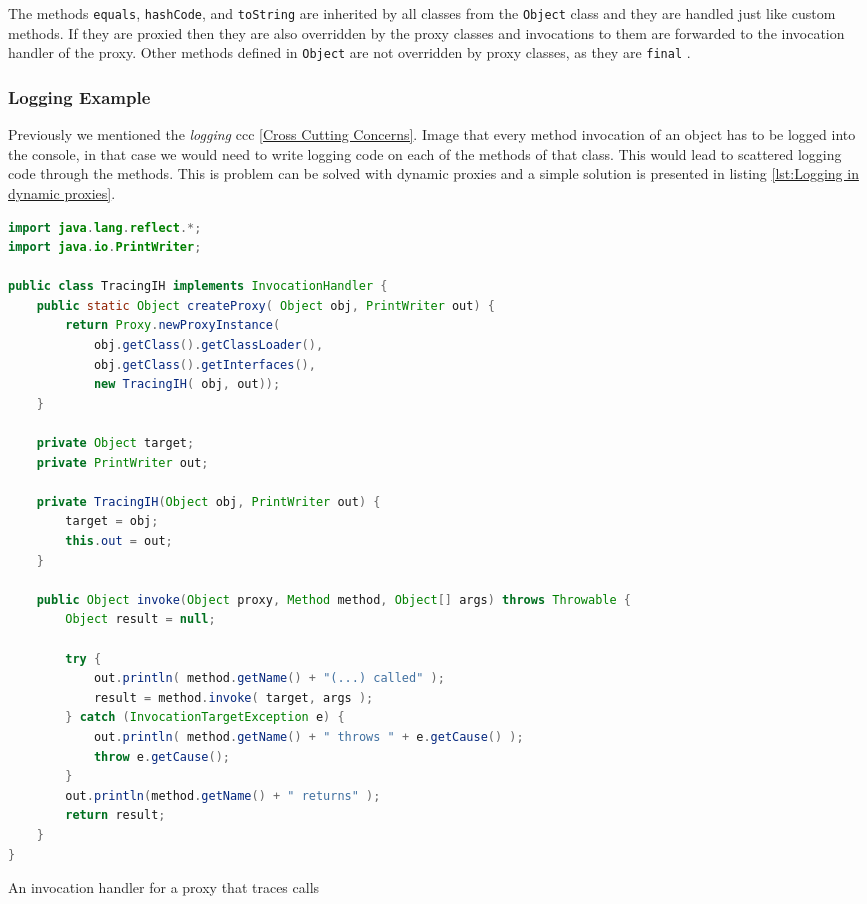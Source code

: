 The methods \texttt{equals}, \texttt{hashCode}, and \texttt{toString} are inherited by all classes from the \texttt{Object} class and they are handled just like custom methods.
If they are proxied then they are also overridden by the proxy classes and invocations to them are forwarded to the invocation handler of the proxy. 
Other methods defined in \texttt{Object} are not overridden by proxy classes, as they are \texttt{final} \cite{eugster2006uniform}.

\subsubsection{Logging Example}
Previously we mentioned the \textit{logging} \ac{ccc} \ref{Cross Cutting Concerns}.
Image that every method invocation of an object has to be logged into the console, in that case we would need to write logging code on each of the methods of that class.
This would lead to scattered logging code through the methods.
This is problem can be solved with dynamic proxies and a simple solution is presented in listing \ref{lst:Logging in dynamic proxies}.

\begin{sourcecode}[H]
	\begin{lstlisting}[language=Java]
import java.lang.reflect.*;
import java.io.PrintWriter;

public class TracingIH implements InvocationHandler {
    public static Object createProxy( Object obj, PrintWriter out) {
        return Proxy.newProxyInstance(
            obj.getClass().getClassLoader(),
            obj.getClass().getInterfaces(),
            new TracingIH( obj, out));
    }

    private Object target;
    private PrintWriter out;

    private TracingIH(Object obj, PrintWriter out) {
        target = obj;
        this.out = out;
    }

    public Object invoke(Object proxy, Method method, Object[] args) throws Throwable {
        Object result = null;

        try {
            out.println( method.getName() + "(...) called" );
            result = method.invoke( target, args );
        } catch (InvocationTargetException e) {
            out.println( method.getName() + " throws " + e.getCause() );
            throw e.getCause();
        }
        out.println(method.getName() + " returns" );
        return result;
    }
}	

	\end{lstlisting}
	\caption{An invocation handler for a proxy that traces calls \cite{forman2004java}}
	\label{lst:Logging in dynamic proxies}
\end{sourcecode}


